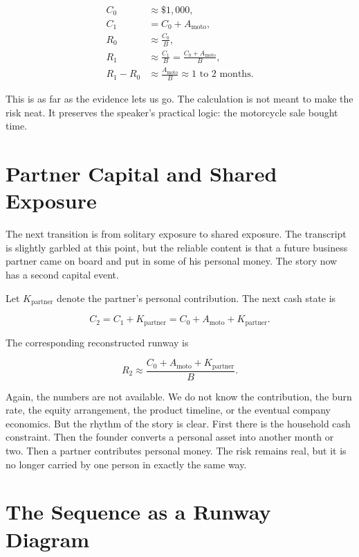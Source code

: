 \begin{align}
C_0 &\approx \$1{,}000, \\
C_1 &= C_0 + A_{\mathrm{moto}}, \\
R_0 &\approx \frac{C_0}{B}, \\
R_1 &\approx \frac{C_1}{B}
     = \frac{C_0 + A_{\mathrm{moto}}}{B}, \\
R_1 - R_0 &\approx \frac{A_{\mathrm{moto}}}{B}
          \approx 1\text{ to }2 \text{ months}.
\end{align}

This is as far as the evidence lets us go. The calculation is not meant to make the risk neat. It preserves the speaker's practical logic: the motorcycle sale bought time.

\section{Partner Capital and Shared Exposure}

The next transition is from solitary exposure to shared exposure. The transcript is slightly garbled at this point, but the reliable content is that a future business partner came on board and put in some of his personal money. The story now has a second capital event.

Let \(K_{\mathrm{partner}}\) denote the partner's personal contribution. The next cash state is

\begin{equation}
C_2 = C_1 + K_{\mathrm{partner}}
    = C_0 + A_{\mathrm{moto}} + K_{\mathrm{partner}} .
\end{equation}

The corresponding reconstructed runway is

\begin{equation}
R_2 \approx \frac{C_0 + A_{\mathrm{moto}} + K_{\mathrm{partner}}}{B}.
\end{equation}

Again, the numbers are not available. We do not know the contribution, the burn rate, the equity arrangement, the product timeline, or the eventual company economics. But the rhythm of the story is clear. First there is the household cash constraint. Then the founder converts a personal asset into another month or two. Then a partner contributes personal money. The risk remains real, but it is no longer carried by one person in exactly the same way.

\section{The Sequence as a Runway Diagram}

